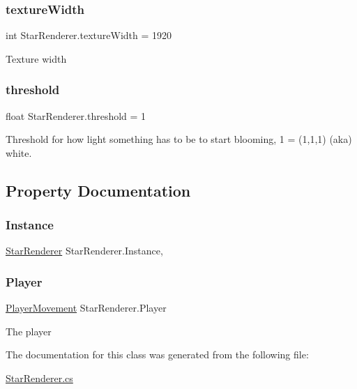 \subsubsection{\texorpdfstring{textureWidth}{textureWidth}}
{\footnotesize\ttfamily int Star\+Renderer.\+texture\+Width = 1920}



Texture width 

\mbox{\label{class_star_renderer_aedb60f380d5c481c8f2b76111cc943f2}} 
\subsubsection{\texorpdfstring{threshold}{threshold}}
{\footnotesize\ttfamily float Star\+Renderer.\+threshold = 1}



Threshold for how light something has to be to start blooming, 1 = (1,1,1) (aka) white. 



\subsection{Property Documentation}
\mbox{\label{class_star_renderer_ad0781969b2fc50528fbd1424adf0e624}} 
\subsubsection{\texorpdfstring{Instance}{Instance}}
{\footnotesize\ttfamily \mbox{\hyperlink{class_star_renderer}{Star\+Renderer}} Star\+Renderer.\+Instance\hspace{0.3cm}{\ttfamily [static]}, {\ttfamily [get]}}

\mbox{\label{class_star_renderer_a57a17cbf59b7a6f0d9f3ed9cd1b758f2}} 
\subsubsection{\texorpdfstring{Player}{Player}}
{\footnotesize\ttfamily \mbox{\hyperlink{class_player_movement}{Player\+Movement}} Star\+Renderer.\+Player\hspace{0.3cm}{\ttfamily [get]}}



The player 



The documentation for this class was generated from the following file\+:\begin{DoxyCompactItemize}
\item 
\mbox{\hyperlink{_star_renderer_8cs}{Star\+Renderer.\+cs}}\end{DoxyCompactItemize}
